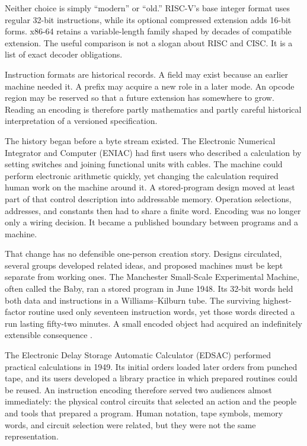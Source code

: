 Neither choice is simply ``modern'' or ``old.'' RISC-V's base integer format
uses regular 32-bit instructions, while its optional compressed extension adds
16-bit forms. x86-64 retains a variable-length family shaped by decades of
compatible extension. The useful comparison is not a slogan about RISC and
CISC. It is a list of exact decoder obligations.

\begin{archive}[title={Compatibility leaves marks in the byte stream}]
Instruction formats are historical records. A field may exist because an
earlier machine needed it. A prefix may acquire a new role in a later mode.
An opcode region may be reserved so that a future extension has somewhere to
grow. Reading an encoding is therefore partly mathematics and partly careful
historical interpretation of a versioned specification.
\end{archive}

The history began before a byte stream existed. The Electronic Numerical
Integrator and Computer (ENIAC) had first users who described
a calculation by setting switches and joining functional units with cables.
The machine could perform electronic arithmetic quickly, yet changing the
calculation required human work on the machine around it. A stored-program
design moved at least part of that control description into addressable
memory. Operation selections, addresses, and constants then had to share a
finite word. Encoding was no longer only a wiring decision. It became a
published boundary between programs and a machine.

That change has no defensible one-person creation story. Designs circulated,
several groups developed related ideas, and proposed machines must be kept
separate from working ones. The Manchester Small-Scale Experimental Machine,
often called the Baby, ran a stored program in June 1948. Its 32-bit words
held both data and instructions in a Williams--Kilburn tube. The surviving
highest-factor routine used only seventeen instruction words, yet those words
directed a run lasting fifty-two minutes. A small encoded object had acquired
an indefinitely extensible consequence \autocite{chm2026storedprogram}.

The Electronic Delay Storage Automatic Calculator (EDSAC) performed practical
calculations in 1949. Its initial orders loaded
later orders from punched tape, and its users developed a library practice in
which prepared routines could be reused. An instruction encoding therefore
served two audiences almost immediately: the physical control circuits that
selected an action and the people and tools that prepared a program. Human
notation, tape symbols, memory words, and circuit selection were related, but
they were not the same representation.

